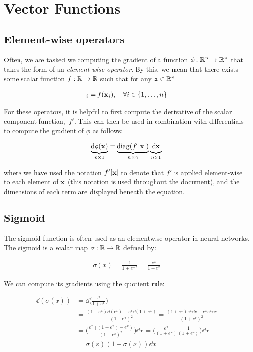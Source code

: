 \chapter{Vector Functions} \label{chap:vector}

\section{Element-wise operators}

Often, we are tasked we computing the gradient of a function $\phi: \mathbb{R}^n \to \mathbb{R}^n$ that takes the form of an \textit{element-wise operator}.  By this, we mean that there exists some scalar function $f:\mathbb{R} \to \mathbb{R}$ such that for any $\mathbf{x} \in \mathbb{R}^n$

\begin{align}
  [\phi(\xx)]_i = f(\xx_i), \quad \forall i \in \{1, \dots, n\}
\end{align}

For these operators, it is helpful to first compute the derivative of the scalar component function,~$f'$.  This can then be used in combination with differentials to compute the gradient of $\phi$ as follows:

\begin{align}
  \underbrace{{\operatorname{\text{d}}}\phi(\mathbf{x})}_{n \times 1} = \underbrace{\operatorname{diag}(f'[\mathbf{x}])}_{n \times n} \underbrace{\vphantom{(}{\operatorname{\text{d}}
}\mathbf{x}}_{n \times 1} \label{eqn:eltwise-differentials}
\end{align}

where we have used the notation $f'[\mathbf{x}]$ to denote that $f'$ is applied element-wise to each element of $\mathbf{x}$ (this notation is used throughout the document), and the dimensions of each term are displayed beneath the equation. 


\section{Sigmoid}

The sigmoid function is often used as an elementwise operator in neural networks.  The sigmoid is a scalar map $\sigma : \mathbb{R} \to \mathbb{R}$ defined by: 

\begin{align}
\sigma (x) = \frac{1}{1 + e^{-x}} = \frac{e^x}{1 + e^x}  
\end{align}


We can compute its gradients using the quotient rule:

\begin{align*}
  \dd (\sigma(x)) &= {\dd} \bigg(\frac{e^x}{1 + e^x}\bigg) \\
                  &= \frac{(1 + e^x) \dd (e^x) - e^x \dd (1 + e^x)}{(1 + e^x)^2}
               = \frac{(1 + e^x)e^x \dd x - e^x e^x \dd x}{(1 + e^x)^2} \\
               &= \Bigg(\frac{e^x((1 + e^x) - e^x)}{(1 + e^x)^2}\Bigg)\dd x = \Bigg(\frac{e^x}{(1 + e^x)}\frac{1}{(1 + e^x)}\Bigg){\dd} x \\
               &= \sigma(x)(1 - \sigma(x)) {\dd} x \\                              
\end{align*}

